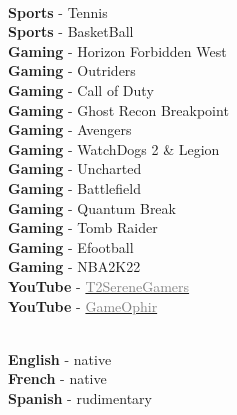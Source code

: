\documentclass[9pt]{adeckcv} %
\begin{document}
\begin{minipage}[t]{0.3\textwidth}
	\vspace{-\baselineskip} %
	\\
	\textbf{Sports} - Tennis\\
	\textbf{Sports} - BasketBall\\
	\textbf{Gaming} - Horizon Forbidden West \\
	\textbf{Gaming} - Outriders \\
	\textbf{Gaming} - Call of Duty \\
	\textbf{Gaming} - Ghost Recon Breakpoint \\
	\textbf{Gaming} - Avengers \\
	\textbf{Gaming} - WatchDogs 2 \& Legion \\
	\textbf{Gaming} - Uncharted \\
	\textbf{Gaming} - Battlefield \\
	\textbf{Gaming} - Quantum Break \\
	\textbf{Gaming} - Tomb Raider \\
	\textbf{Gaming} - Efootball \\
	\textbf{Gaming} - NBA2K22 \\
	\textbf{YouTube} - \href{https://www.youtube.com/@t2serenegamers67}{\textcolor{gray}{T2SereneGamers}} \\
	\textbf{YouTube} - \href{https://www.youtube.com/@gameophir5827}{\textcolor{gray}{GameOphir}}
\end{minipage}
\hfill
\begin{minipage}[t]{0.3\textwidth}
	\vspace{-\baselineskip} %
	
	\\
	\textbf{English} - native\\
	\textbf{French} - native\\
	\textbf{Spanish} - rudimentary
\end{minipage}

\end{document}
